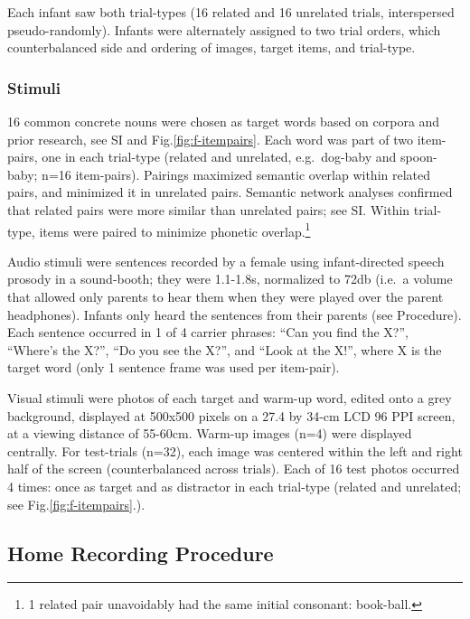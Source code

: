 \documentclass[9pt,twocolumn,twoside,]{pnas-new}
\begin{document}
Each infant saw both trial-types (16 related and 16 unrelated trials,
interspersed pseudo-randomly). Infants were alternately assigned to two
trial orders, which counterbalanced side and ordering of images, target
items, and trial-type.

\subsubsection*{Stimuli}\label{stimuli}

16 common concrete nouns were chosen as target words based on corpora
and prior research, see SI and Fig.\ref{fig:f-itempairs}. Each word was
part of two item-pairs, one in each trial-type (related and unrelated,
e.g.~dog-baby and spoon-baby; n=16 item-pairs). Pairings maximized
semantic overlap within related pairs, and minimized it in unrelated
pairs. Semantic network analyses confirmed that related pairs were more
similar than unrelated pairs; see SI. Within trial-type, items were
paired to minimize phonetic overlap.\footnote{1 related pair unavoidably
  had the same initial consonant: book-ball.}

Audio stimuli were sentences recorded by a female using infant-directed
speech prosody in a sound-booth; they were 1.1-1.8s, normalized to 72db
(i.e.~a volume that allowed only parents to hear them when they were
played over the parent headphones). Infants only heard the sentences
from their parents (see Procedure). Each sentence occurred in 1 of 4
carrier phrases: ``Can you find the X?'', ``Where's the X?'', ``Do you
see the X?'', and ``Look at the X!'', where X is the target word (only 1
sentence frame was used per item-pair).

Visual stimuli were photos of each target and warm-up word, edited onto
a grey background, displayed at 500x500 pixels on a 27.4 by 34-cm LCD 96
PPI screen, at a viewing distance of 55-60cm. Warm-up images (n=4) were
displayed centrally. For test-trials (n=32), each image was centered
within the left and right half of the screen (counterbalanced across
trials). Each of 16 test photos occurred 4 times: once as target and as
distractor in each trial-type (related and unrelated; see
Fig.\ref{fig:f-itempairs}.).

\subsection*{Home Recording Procedure}\label{homerecproc}
\end{document}
